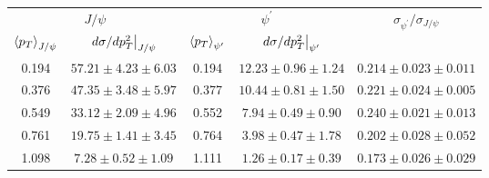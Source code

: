 \begin{tabular}{cc|cc|c}
\hline
\multicolumn{2}{c|}{$J/\psi$}                                 & \multicolumn{2}{c|}{$\psi^{\prime}$}                                 & \multirow{2}{*}{$\sigma_{\psi^\prime}/\sigma_{J/\psi}$} \\ \cline{1-4}
$\expval{p_T}_{J/\psi}$    & $\eval{d\sigma/dp^2_T}_{J/\psi}$ & $\expval{p_T}_{\psi^\prime}$ & $\eval{d\sigma/dp^2_T}_{\psi^\prime}$ &                                                         \\ \hline
\multicolumn{1}{c|}{0.194} & $57.21\pm4.23\pm6.03$            & \multicolumn{1}{c|}{0.194}   & $12.23\pm0.96\pm1.24$                 & $0.214\pm0.023\pm0.011$                                 \\
\multicolumn{1}{c|}{0.376} & $47.35\pm3.48\pm5.97$            & \multicolumn{1}{c|}{0.377}   & $10.44\pm0.81\pm1.50$                 & $0.221\pm0.024\pm0.005$                                 \\
\multicolumn{1}{c|}{0.549} & $33.12\pm2.09\pm4.96$            & \multicolumn{1}{c|}{0.552}   & $7.94\pm0.49\pm0.90$                  & $0.240\pm0.021\pm0.013$                                 \\
\multicolumn{1}{c|}{0.761} & $19.75\pm1.41\pm3.45$            & \multicolumn{1}{c|}{0.764}   & $3.98\pm0.47\pm1.78$                  & $0.202\pm0.028\pm0.052$                                 \\
\multicolumn{1}{c|}{1.098} & $7.28\pm0.52\pm1.09$             & \multicolumn{1}{c|}{1.111}   & $1.26\pm0.17\pm0.39$                  & $0.173\pm0.026\pm0.029$                                 \\ \hline
\end{tabular}

